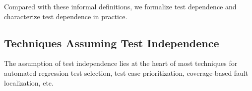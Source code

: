 Compared with these informal definitions,
we formalize test dependence and characterize 
test dependence in practice.



\subsection{Techniques Assuming Test Independence}

The assumption of test independence lies at the heart of most
techniques for automated regression test selection,
test case prioritization, coverage-based
fault localization, etc. 


